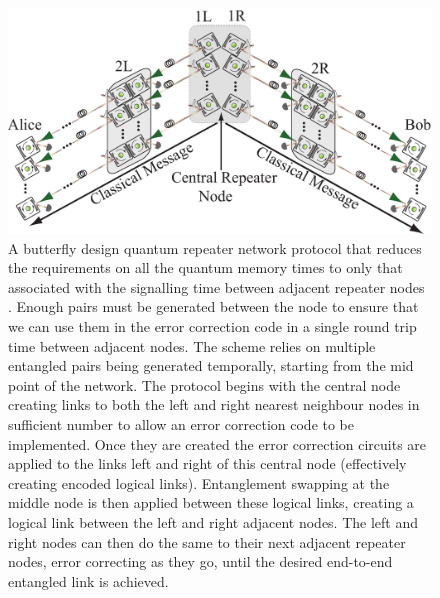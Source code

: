 \documentclass[twocolumn, aps, rmp, amsmath, amssymb, nofootinbib, superscriptaddress, longbibliography, floatfix, table-of-contents, eqsecnum]{revtex4-1}
\newcommand{\comment}[1]{{\color{blue}{\textbf{#1}}}}
\begin{document}
\begin{figure}[!htb]
\includegraphics[width=\textwidth]{repeaters_8}
\caption{\comment{Redo fig}A butterfly design quantum repeater network protocol that reduces the requirements on all the quantum memory times to only that associated with the signalling time between adjacent repeater nodes \cite{bib:munro10}. Enough pairs must be generated between the node to ensure that we can use them in the error correction code in a single round trip time between adjacent nodes. The scheme relies on multiple entangled pairs being generated temporally, starting from the mid point of the network. The protocol begins with the central node creating links to both the left and right nearest neighbour nodes in sufficient number to allow an error correction code to be implemented. Once they are created the error correction circuits are applied to the links left and right of this central node (effectively creating encoded logical links). Entanglement swapping at the middle node is then applied  between these logical links, creating a logical link between the left and right adjacent nodes. The left and right nodes can then do the same to their next adjacent repeater nodes, error correcting as they go, until the desired end-to-end entangled link is achieved.  }
\label{fig:repeaters_8}
\end{figure} 
\end{document}

